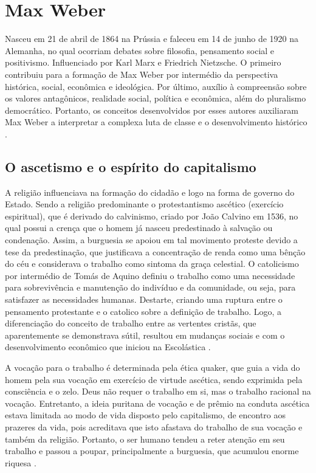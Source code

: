 \newpage
\section{Max Weber}\label{weber}

Nasceu em 21 de abril de 1864 na Prússia e faleceu em 14 de junho de 1920 na Alemanha, no qual ocorriam debates sobre filosofia, pensamento social e positivismo.
Influenciado por Karl Marx e Friedrich Nietzsche.
O primeiro contribuiu para a formação de Max Weber por intermédio da perspectiva histórica, social, econômica e ideológica.
Por último, auxílio à compreensão sobre os valores antagônicos, realidade social, política e econômica, além do pluralismo democrático.
Portanto, os conceitos desenvolvidos por esses autores auxiliaram Max Weber a interpretar a complexa luta de classe e o desenvolvimento histórico \cite{quintaneiro2003toque}.


\subsection{O ascetismo e o espírito do capitalismo}

A religião influenciava na formação do cidadão e logo na forma de governo do Estado.
Sendo a religião predominante o protestantismo ascético (exercício espiritual), que é derivado do calvinismo, criado por João Calvino em 1536, no qual possui a crença que o homem já nasceu predestinado à salvação ou condenação. 
Assim, a burguesia se apoiou em tal movimento proteste devido a tese da predestinação, que justificava a concentração de renda como uma bênção do céu e considerava o trabalho como sintoma da graça celestial. 
O catolicismo por intermédio de Tomás de Aquino definiu o trabalho como uma necessidade para sobrevivência e manutenção do indivíduo e da comunidade, ou seja, para satisfazer as necessidades humanas. 
Destarte, criando uma ruptura entre o pensamento protestante e o catolico sobre a definição de trabalho. 
Logo, a diferenciação do conceito de trabalho entre as vertentes cristãs, que aparentemente se demonstrava sútil, resultou em mudanças sociais e com o desenvolvimento econômico que iniciou na Escolástica \cite{weber}.

A vocação para o trabalho é determinada pela ética quaker, que guia a vida do homem pela sua vocação em exercício de virtude ascética, sendo exprimida pela consciência e o zelo.
Deus não requer o trabalho em si, mas o trabalho racional na vocação.
Entretanto, a ideia puritana de vocação e de prêmio na conduta ascética estava limitada ao modo de vida disposto pelo capitalismo, de encontro aos prazeres da vida, pois acreditava que isto afastava do trabalho de sua vocação e também da religião.  
Portanto, o ser humano tendeu a reter atenção em seu trabalho e passou a poupar, principalmente a burguesia, que acumulou enorme riquesa \cite{weber}.


